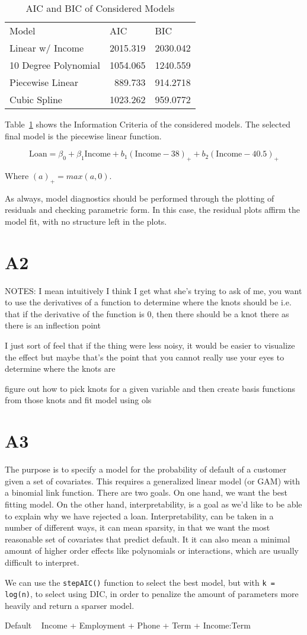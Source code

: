 \begin{table}[htbp]
  \centering
    \begin{tabular}{lrr}
    Model & \multicolumn{1}{l}{AIC} & \multicolumn{1}{l}{BIC} \\
    Linear w/ Income & 2015.319 & 2030.042 \\
    10 Degree Polynomial & 1054.065 & 1240.559 \\
    Piecewise Linear & 889.733 & 914.2718 \\
    Cubic Spline & 1023.262 & 959.0772 \\
    \end{tabular}%
  \caption{AIC and BIC of Considered Models}
  \label{a1_tab}%
\end{table}%


Table~\ref{a1_tab} shows the Information Criteria of the considered models. The selected final model is the piecewise linear function. 

$$\text{Loan} = \beta_0 + \beta_1\text{Income} + b_1(\text{Income} - 38)_+ + b_2(\text{Income} - 40.5)_+ $$

Where $(a)_+ = max(a, 0)$. 

As always, model diagnostics should be performed through the plotting of residuals and checking parametric form. In this case, the residual plots affirm the model fit, with no structure left in the plots. 


\section{A2}


NOTES:
I mean intuitively I think I get what she's trying to ask of me, you want to use the derivatives of a function to determine where the knots should be
i.e. that if the derivative of the function is 0, then there should be a knot there as there is an inflection point

I just sort of feel that if the thing were less noisy, it would be easier to visualize the effect
but maybe that's the point
that you cannot really use your eyes to determine where the knots are

figure out how to pick knots for a given variable
and then create basis functions from those knots
and fit model using ols


\section{A3}

The purpose is to specify a model for the probability of default of a customer given a set of covariates. This requires a generalized linear model (or GAM) with a binomial link function. There are two goals. On one hand, we want the best fitting model. On the other hand, interpretability, is a goal as we'd like to be able to explain why we have rejected a loan. Interpretability, can be taken in a number of different ways, it can mean sparsity, in that we want the most reasonable set of covariates that predict default. It it can also mean a minimal amount of higher order effects like polynomials or interactions, which are usually difficult to interpret. 

We can use the \lstinline{stepAIC()} function to select the best model, but with \lstinline{k = log(n)}, to select using DIC, in order to penalize the amount of parameters more heavily and return a sparser model.


Default ~ Income + Employment + Phone + Term + Income:Term

